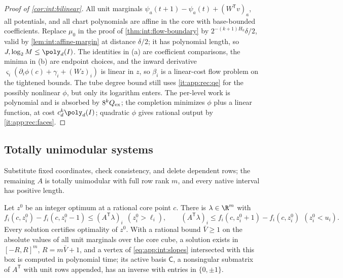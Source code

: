 \begin{proof}[Proof of \cref{cor:int:bilinear}]
All unit marginals $\psi_a(t+1)-\psi_a(t)+(W^{\mathsf T}v)_a$, all potentials, and all
chart polynomials are affine in the core with base-bounded coefficients. Replace
$\mu_0$ in the proof of \cref{thm:int:flow-boundary} by
$2^{-(k+1)H_0}\delta/2$, valid by \cref{lem:int:affine-margin} at distance $\delta/2$;
it has polynomial length, so $J,\log_2M\le\poly_d(I)$. The identities in (a) are
coefficient comparisons, the minima in (b) are endpoint choices, and the inward
derivative $\varsigma_i(\partial_i\phi(c)+\gamma_i+(Wz)_i)$ is linear in $z$, so $\beta_i$
is a linear-cost flow problem on the tightened bounds. The tube degree bound still uses
\ref{it:app:rec:qe} for the possibly nonlinear $\phi$, but only its logarithm enters. The
per-level work is polynomial and is absorbed by $8^kQ_{\rm ex}$; the completion
minimizes $\phi$ plus a linear function, at cost $c_d^k\poly_d(I)$; quadratic $\phi$
gives rational output by \ref{it:app:rec:faces}.
\end{proof}

\subsection{Totally unimodular systems}\label{app:int:tu}

Substitute fixed coordinates, check consistency, and delete dependent rows; the
remaining $A$ is totally unimodular with full row rank $m$, and every native interval
has positive length.

\begin{lemma}\label{lem:int:tu-dual}
Let $z^0$ be an integer optimum at a rational core point $c$. There is
$\lambda\in\R^m$ with
\begin{equation}\label{eq:app:int:slopes}
 f_i(c,z^0_i)-f_i(c,z^0_i-1)\le(A^{\mathsf T}\lambda)_i\ \ (z^0_i>\ell_i),\qquad
 (A^{\mathsf T}\lambda)_i\le f_i(c,z^0_i+1)-f_i(c,z^0_i)\ \ (z^0_i<u_i).
\end{equation}
Every solution certifies optimality of $z^0$. With a rational bound $\bar V\ge1$ on the
absolute values of all unit marginals over the core cube, a solution exists in
$[-R,R]^m$, $R=m\bar V+1$, and a vertex of \eqref{eq:app:int:slopes} intersected with this
box is computed in polynomial time; its active basis $\mathsf C$, a nonsingular
submatrix of $A^{\mathsf T}$ with unit rows appended, has an inverse with entries in
$\{0,\pm1\}$.
\end{lemma}

